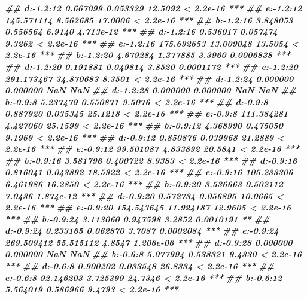 \documentclass[
]{book}
\newenvironment{Shaded}{\begin{snugshade}}{\end{snugshade}}
\newcommand{\DocumentationTok}[1]{\textcolor[rgb]{0.56,0.35,0.01}{\textbf{\textit{#1}}}}
\begin{document}
\begin{Shaded}
\begin{Highlighting}[]
\DocumentationTok{\#\# d:{-}1.2:12   0.667099   0.053329 12.5092 \textless{} 2.2e{-}16 ***}
\DocumentationTok{\#\# e:{-}1.2:12 145.571114   8.562685 17.0006 \textless{} 2.2e{-}16 ***}
\DocumentationTok{\#\# b:{-}1.2:16   3.848053   0.556564  6.9140 4.713e{-}12 ***}
\DocumentationTok{\#\# d:{-}1.2:16   0.536017   0.057474  9.3262 \textless{} 2.2e{-}16 ***}
\DocumentationTok{\#\# e:{-}1.2:16 175.692653  13.009048 13.5054 \textless{} 2.2e{-}16 ***}
\DocumentationTok{\#\# b:{-}1.2:20   4.679284   1.377885  3.3960 0.0006838 ***}
\DocumentationTok{\#\# d:{-}1.2:20   0.191881   0.049814  3.8520 0.0001172 ***}
\DocumentationTok{\#\# e:{-}1.2:20 291.173467  34.870683  8.3501 \textless{} 2.2e{-}16 ***}
\DocumentationTok{\#\# d:{-}1.2:24   0.000000   0.000000     NaN       NaN    }
\DocumentationTok{\#\# d:{-}1.2:28   0.000000   0.000000     NaN       NaN    }
\DocumentationTok{\#\# b:{-}0.9:8    5.237479   0.550871  9.5076 \textless{} 2.2e{-}16 ***}
\DocumentationTok{\#\# d:{-}0.9:8    0.887920   0.035345 25.1218 \textless{} 2.2e{-}16 ***}
\DocumentationTok{\#\# e:{-}0.9:8  111.384281   4.427060 25.1599 \textless{} 2.2e{-}16 ***}
\DocumentationTok{\#\# b:{-}0.9:12   4.368990   0.475050  9.1969 \textless{} 2.2e{-}16 ***}
\DocumentationTok{\#\# d:{-}0.9:12   0.850876   0.039968 21.2889 \textless{} 2.2e{-}16 ***}
\DocumentationTok{\#\# e:{-}0.9:12  99.501087   4.833892 20.5841 \textless{} 2.2e{-}16 ***}
\DocumentationTok{\#\# b:{-}0.9:16   3.581796   0.400722  8.9383 \textless{} 2.2e{-}16 ***}
\DocumentationTok{\#\# d:{-}0.9:16   0.816041   0.043892 18.5922 \textless{} 2.2e{-}16 ***}
\DocumentationTok{\#\# e:{-}0.9:16 105.233306   6.461986 16.2850 \textless{} 2.2e{-}16 ***}
\DocumentationTok{\#\# b:{-}0.9:20   3.536663   0.502112  7.0436 1.874e{-}12 ***}
\DocumentationTok{\#\# d:{-}0.9:20   0.572734   0.056895 10.0665 \textless{} 2.2e{-}16 ***}
\DocumentationTok{\#\# e:{-}0.9:20 154.543645  11.924187 12.9605 \textless{} 2.2e{-}16 ***}
\DocumentationTok{\#\# b:{-}0.9:24   3.113060   0.947598  3.2852 0.0010191 ** }
\DocumentationTok{\#\# d:{-}0.9:24   0.233165   0.062870  3.7087 0.0002084 ***}
\DocumentationTok{\#\# e:{-}0.9:24 269.509412  55.515112  4.8547 1.206e{-}06 ***}
\DocumentationTok{\#\# d:{-}0.9:28   0.000000   0.000000     NaN       NaN    }
\DocumentationTok{\#\# b:{-}0.6:8    5.077994   0.538321  9.4330 \textless{} 2.2e{-}16 ***}
\DocumentationTok{\#\# d:{-}0.6:8    0.900202   0.033548 26.8334 \textless{} 2.2e{-}16 ***}
\DocumentationTok{\#\# e:{-}0.6:8   92.146203   3.725399 24.7346 \textless{} 2.2e{-}16 ***}
\DocumentationTok{\#\# b:{-}0.6:12   5.564019   0.586966  9.4793 \textless{} 2.2e{-}16 ***}

\end{Highlighting}
\end{Shaded}
\end{document}
